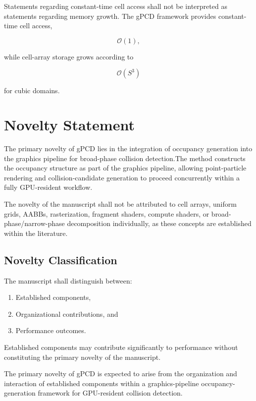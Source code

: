 Statements regarding constant-time cell access shall not be interpreted
as statements regarding memory growth. The gPCD framework provides
constant-time cell access,

\begin{equation}
\mathcal{O}(1),
\end{equation}

while cell-array storage grows according to

\begin{equation}
\mathcal{O}(S^3)
\end{equation}

for cubic domains.


\section{Novelty Statement}

The primary novelty of gPCD lies in the integration of occupancy
generation into the graphics pipeline for broad-phase collision
detection.The method constructs the occupancy structure as part of the graphics pipeline,
allowing point-particle rendering and collision-candidate generation
to proceed concurrently within a fully GPU-resident workflow.

The novelty of the manuscript shall not be attributed to cell arrays,
uniform grids, AABBs, rasterization, fragment shaders, compute shaders,
or broad-phase/narrow-phase decomposition individually, as these
concepts are established within the literature.

\subsection{Novelty Classification}

The manuscript shall distinguish between:

\begin{enumerate}
\item Established components,
\item Organizational contributions, and
\item Performance outcomes.
\end{enumerate}

Established components may contribute significantly to performance
without constituting the primary novelty of the manuscript.

The primary novelty of gPCD is expected to arise from the organization
and interaction of established components within a graphics-pipeline
occupancy-generation framework for GPU-resident collision detection.

